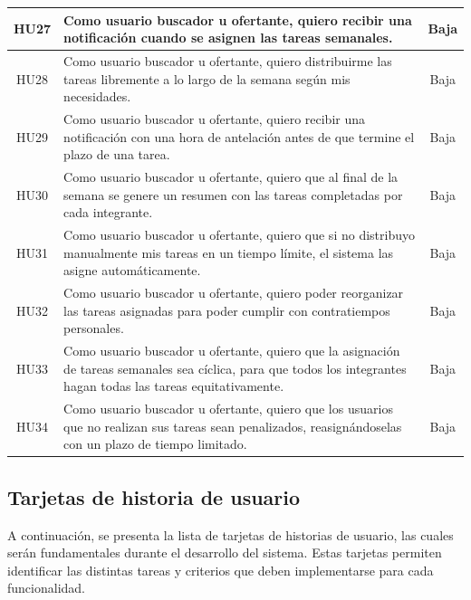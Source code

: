 \begin{longtable}{|c|p{8cm}|c|}
\hline
HU27 & Como usuario buscador u ofertante, quiero recibir una notificación cuando se asignen las tareas semanales. & Baja \\
\hline
HU28 & Como usuario buscador u ofertante, quiero distribuirme las tareas libremente a lo largo de la semana según mis necesidades. & Baja \\
\hline
HU29 & Como usuario buscador u ofertante, quiero recibir una notificación con una hora de antelación antes de que termine el plazo de una tarea. & Baja \\
\hline
HU30 & Como usuario buscador u ofertante, quiero que al final de la semana se genere un resumen con las tareas completadas por cada integrante. & Baja \\
\hline
HU31 & Como usuario buscador u ofertante, quiero que si no distribuyo manualmente mis tareas en un tiempo límite, el sistema las asigne automáticamente. & Baja \\
\hline
HU32 & Como usuario buscador u ofertante, quiero poder reorganizar las tareas asignadas para poder cumplir con contratiempos personales. & Baja \\
\hline
HU33 & Como usuario buscador u ofertante, quiero que la asignación de tareas semanales sea cíclica, para que todos los integrantes hagan todas las tareas equitativamente. & Baja \\
\hline
HU34 & Como usuario buscador u ofertante, quiero que los usuarios que no realizan sus tareas sean penalizados, reasignándoselas con un plazo de tiempo limitado. & Baja \\
\hline
\end{longtable}
\newpage
\subsection{Tarjetas de historia de usuario}
A continuación, se presenta la lista de tarjetas de historias de usuario, las cuales serán fundamentales durante el desarrollo del sistema. Estas tarjetas permiten identificar las distintas tareas y criterios que deben implementarse para cada funcionalidad.



